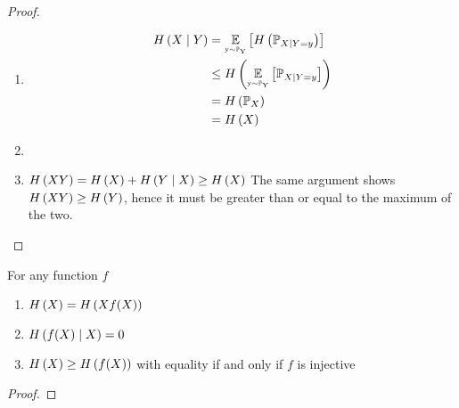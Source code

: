 \begin{proof}\mbox{}
    \begin{enumerate}[label=(\arabic*)]
        \item \begin{align*}\entropy{X \given Y}
                   & = \expectation[y \drawnfrom \Pr_Y]{\entropy{\Pr_{X \given Y = y}}}    \\
                   & \leq \entropy{\expectation[y \drawnfrom \Pr_Y]{\Pr_{X \given Y = y}}} \\
                   & = \entropy{\Pr_X}                                                     \\
                   & = \entropy{X}
              \end{align*}
        \item
        \item $H\left(XY\right) = H\left(X\right) + H\left(Y \mid X\right) \geq H\left(X\right)$
              The same argument shows $H\left(XY\right) \geq H\left(Y\right)$, hence it must be
              greater than or equal to the maximum of the two.
    \end{enumerate}
\end{proof}

\begin{corollary}
    For any function $f$
    \begin{enumerate}[label=(\arabic*)]
        \item $H\left(X\right) = H\left(Xf(X)\right)$
        \item $H\left(f(X) \mid X\right) = 0$
        \item $H\left(X\right) \geq H\left(f(X)\right)$ with equality if and only if $f$
              is injective
    \end{enumerate}
\end{corollary}

\begin{proof}

\end{proof}